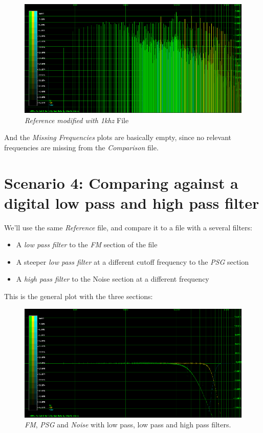 \documentclass[10pt,a4paper]{report}
\begin{document}
\begin{figure}[H]
	\centering
	\includegraphics[width=1.0\linewidth]{plots/Plot3-Spectrogram-1khz}
	\caption[Reference File]{\textit{Reference modified with 1khz} File}
	\label{fig:plot3-spectrogram-1khz}
\end{figure}


And the \textit{Missing Frequencies} plots are basically empty, since no relevant frequencies are missing from the \textit{Comparison} file.

\section{Scenario 4: Comparing against a digital low pass and high pass filter}

We'll use the same \textit{Reference} file, and compare it to a file with a several filters:

\begin{itemize}
	\item A \textit{low pass filter} to the \textit{FM} section of the file
	\item A steeper \textit{low pass filter} at a different cutoff frequency to the \textit{PSG} section
	\item A \textit{high pass filter} to the Noise section at a different frequency
\end{itemize}

This is the general plot with the three sections:

\begin{figure}[H]
	\centering
	\includegraphics[width=1.0\linewidth]{plots/Plot4-1-All}
	\caption[All Plotted]{\textit{FM}, \textit{PSG} and \textit{Noise} with low pass, low pass and high pass filters.}
	\label{fig:plot4-1-all}
\end{figure}
\end{document}
